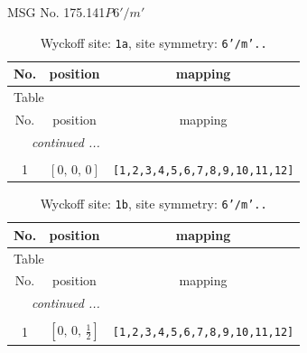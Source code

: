 \documentclass[fleqn,8pt]{jsarticle}
\begin{document}
\setcounter{MaxMatrixCols}{32}

\renewcommand{\tablename}{Table~}
\renewcommand{\figurename}{Figure~}
\begin{center}
\LARGE
MSG No. 175.141\quad$P6'/m'$
\end{center}
\renewcommand{\arraystretch}{1.2}
\begin{longtable}{ccc}
\caption{Wyckoff site: {\tt 1a}, site symmetry: {\tt 6'/m'..}}
 \\
 \hline \hline
No. & position & mapping \\ \hline \endfirsthead

\multicolumn{2}{l}{\tablename\ \thetable{}} \\
 \hline \hline
No. & position & mapping \\ \hline \endhead

 \hline \hline
\multicolumn{2}{r}{\footnotesize\it continued ...} \\ \endfoot

 \hline \hline
\multicolumn{2}{r}{} \\ \endlastfoot

1 & $\left[ 0,\, 0,\, 0 \right]$ & {\tt [1,2,3,4,5,6,7,8,9,10,11,12]} \\
\end{longtable}
\renewcommand{\arraystretch}{1.2}
\begin{longtable}{ccc}
\caption{Wyckoff site: {\tt 1b}, site symmetry: {\tt 6'/m'..}}
 \\
 \hline \hline
No. & position & mapping \\ \hline \endfirsthead

\multicolumn{2}{l}{\tablename\ \thetable{}} \\
 \hline \hline
No. & position & mapping \\ \hline \endhead

 \hline \hline
\multicolumn{2}{r}{\footnotesize\it continued ...} \\ \endfoot

 \hline \hline
\multicolumn{2}{r}{} \\ \endlastfoot

1 & $\left[ 0,\, 0,\, \frac{1}{2} \right]$ & {\tt [1,2,3,4,5,6,7,8,9,10,11,12]} \\
\end{longtable}
\renewcommand{\arraystretch}{1.2}
\end{document}

